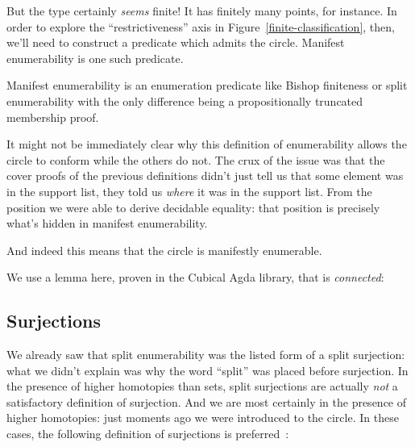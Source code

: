 But the type certainly \emph{seems} finite!
It has finitely many points, for instance.
In order to explore the ``restrictiveness'' axis in
Figure~\ref{finite-classification}, then, we'll need to construct a predicate
which admits the circle.
Manifest enumerability is one such predicate.
\begin{definition}
  Manifest enumerability is an enumeration predicate like Bishop finiteness or
  split enumerability with the only difference being a propositionally truncated
  membership proof.
  \begin{agdalisting}
  \end{agdalisting}
\end{definition}

It might not be immediately clear why this definition of enumerability allows
the circle to conform while the others do not.
The crux of the issue was that the cover proofs of the previous definitions
didn't just tell us that some element was in the support list, they told us
\emph{where} it was in the support list.
From the position we were able to derive decidable equality: that position is
precisely what's hidden in manifest enumerability.

And indeed this means that the circle is manifestly enumerable.
\begin{agdalisting}
\end{agdalisting}
We use a lemma here, proven in the Cubical Agda library, that
 is \emph{connected}:
\begin{agdalisting}
\end{agdalisting}
\subsection{Surjections}
We already saw that split enumerability was the listed form of a split
surjection: what we didn't explain was why the word ``split'' was placed before
surjection.
In the presence of higher homotopies than sets, split surjections are actually
\emph{not} a satisfactory definition of surjection.
And we are most certainly in the presence of higher homotopies: just moments ago
we were introduced to the circle.
In these cases, the following definition of surjections is
preferred~\cite[definition 4.6.1]{hottbook}:
\begin{multicols}{2}
  \begin{agdalisting} \label{surj-eqn}
  \end{agdalisting} \columnbreak
  \begin{agdalisting} \label{surj-arrow-eqn}
  \end{agdalisting}
\end{multicols}

